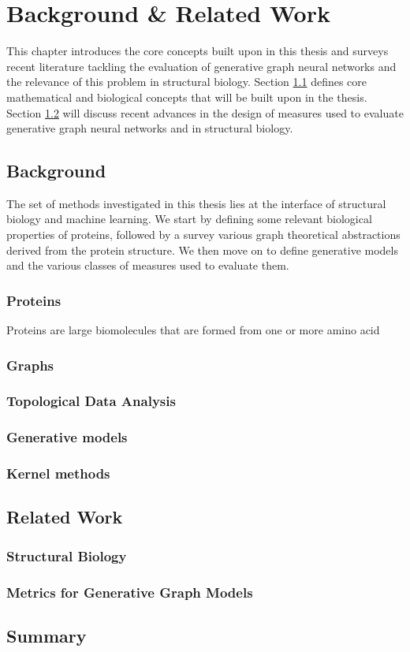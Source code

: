 \chapter{Background \& Related Work}

This chapter introduces the core concepts built upon in this thesis and surveys
recent literature tackling the evaluation of generative graph neural networks
and the relevance of this problem in structural biology. Section
\ref{sec:background} defines core mathematical and biological concepts that will
be built upon in the thesis. Section \ref{sec:related} will discuss recent
advances in the design of measures used to evaluate generative graph neural
networks and in structural biology.

\section{Background}\label{sec:background}

The set of methods investigated in this thesis lies at the interface of
structural biology and machine learning. We start by defining some relevant
biological properties of proteins, followed by a survey various graph theoretical
abstractions derived from the protein structure. We then move on to define
generative models and the various classes of measures used to evaluate them.

\subsection{Proteins}

Proteins are large biomolecules that are formed from one or more amino acid

\subsection{Graphs}

\subsection{Topological Data Analysis}

\subsection{Generative models}

\subsection{Kernel methods}

\section{Related Work}\label{sec:related}

\subsection{Structural Biology}

\subsection{Metrics for Generative Graph Models}

\section{Summary}
